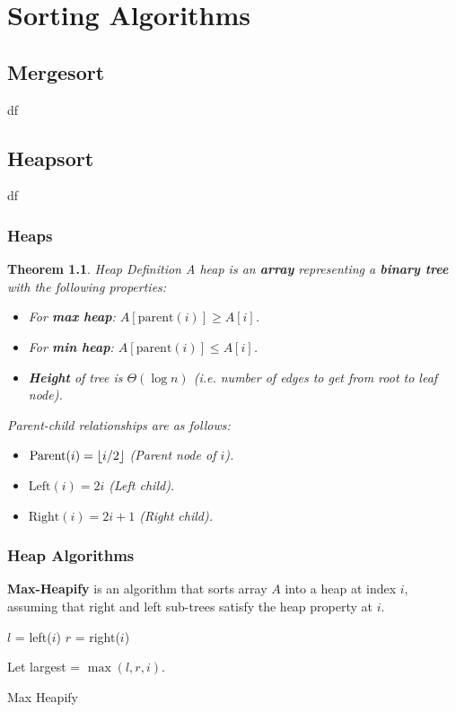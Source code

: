 \documentclass[a4paper,12pt]{report}
\newtheorem{theorem}{Theorem}
\DeclarePairedDelimiter{\floor}{\lfloor}{\rfloor}
\begin{document}
\chapter{Sorting Algorithms}

\section{Mergesort}
df

\section{Heapsort}
df
\subsection{Heaps}

\begin{theorem}{Heap Definition}
A heap is an \textbf{array} representing a \textbf{binary tree} with the following properties:
\begin{itemize}
\item For \textbf{max heap}: $A[\text{parent}(i)] \geq A[i]$.
\item For \textbf{min heap}: $A[\text{parent}(i)] \leq A[i]$.
\item \textbf{Height} of tree is $\Theta(\log n)$ \textit{(i.e. number of edges to get from root to leaf node)}. 
\end{itemize}

Parent-child relationships are as follows:
\begin{itemize}
\item $\text{Parent}(i) = \floor{i/2}$ (Parent node of $i$).
\item $\text{Left}(i) = 2i$ (Left child).
\item $\text{Right}(i) = 2i+1$ (Right child).
\end{itemize}
\end{theorem}

\subsection{Heap Algorithms}

\textbf{Max-Heapify} is an algorithm that sorts array $A$ into a heap at index $i$, assuming that right and left sub-trees satisfy the heap property at $i$. 

\begin{algorithm}[H]
\SetAlgoLined
{}
    \BlankLine
    \BlankLine
    $l$ = left($i$)\;
    $r$ = right($i$)\;

    Let largest = $\max(l,r,i)$.
    
    \caption{Max Heapify}
\end{algorithm}
\end{document}

